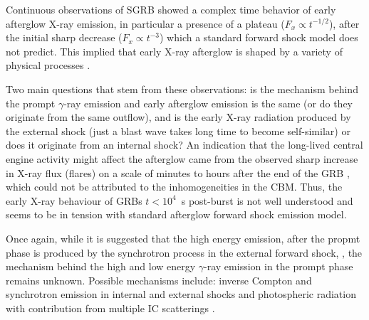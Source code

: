 Continuous observations of \ac{SGRB} showed a complex time behavior of early afterglow X-ray emission, in particular a presence of a plateau ($F_{x}\propto t^{-1/2}$), after the initial sharp decrease ($F_{x}\propto t^{-3}$) which a standard forward shock model does not predict. This implied that early X-ray afterglow is shaped by a variety of physical processes \citep{Zhang:2005fa}.

Two main questions that stem from these observations: is the mechanism behind the prompt $\gamma$-ray emission and early afterglow emission is the same (or do they originate from the same outflow), and is the early X-ray radiation produced by the external shock (just a blast wave takes long time to become self-similar) or does it originate from an internal shock?
An indication that the long-lived central engine activity might affect the afterglow came from the observed sharp increase in X-ray flux (flares) on a scale of minutes to hours after the end of the \ac{GRB}
\citep{Burrows:2005ww,Chincarini:2007fp,Chincarini:2010,Margutti:2011}, which could not be attributed to the inhomogeneities in the \ac{CBM}.
Thus, the early X-ray behaviour of \acp{GRB} $t < 10^{4}$~s post-burst is not well understood and seems to be in tension with standard afterglow forward shock emission model.


Once again, while it is suggested that the high energy emission, after the propmt phase is produced by the synchrotron process in the external forward shock, \citep{Kumar:2009,Ghisellini:2010}, the mechanism behind the high and low energy $\gamma$-ray emission in the prompt phase remains unknown. 
Possible mechanisms include: inverse Compton and synchrotron emission in internal and external shocks
\citep[\eg][]{Rees:1992ek,Dermer:1998py,Lyutikov:2003ih,Zhang:2011} and 
photospheric radiation with contribution from multiple \ac{IC} scatterings
\citep[\eg][]{Thompson:1994zh,Ghisellini:1998jy,Meszaros:1999gb,Peer:2005qoc,Peer:2008udu,Giannios:2006jb,Ioka:2007qk,Asano:2009gi,Lazzati:2010,Beloborodov:2010,Toma:2011}.

